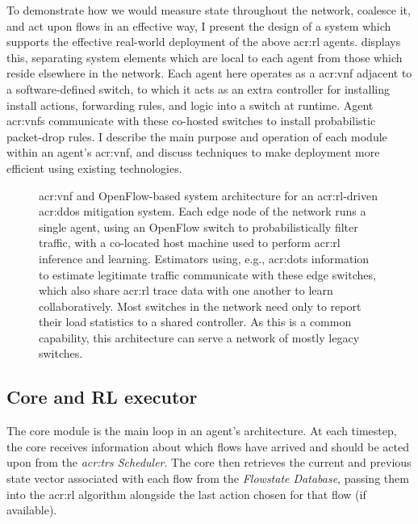 To demonstrate how we would measure state throughout the network, coalesce it, and act upon flows in an effective way, I present the design of a system which supports the effective real-world deployment of the above \gls{acr:rl} agents.
 displays this, separating system elements which are local to each agent from those which reside elsewhere in the network.
Each agent here operates as a \gls{acr:vnf} adjacent to a software-defined switch, to which it acts as an extra controller for installing install actions, forwarding rules, and logic into a switch at runtime.
Agent \glspl{acr:vnf} communicate with these co-hosted switches to install probabilistic packet-drop rules.
I describe the main purpose and operation of each module within an agent's \gls{acr:vnf}, and discuss techniques to make deployment more efficient using existing technologies.

\begin{figure}
	\centering
	\resizebox{\linewidth}{!}{}
	\caption[VNF and OpenFlow-based system architecture for an RL-driven DDoS mitigation system.]{
		\gls{acr:vnf} and OpenFlow-based system architecture for an \gls{acr:rl}-driven \gls{acr:ddos} mitigation system.
		Each edge node of the network runs a single agent, using an OpenFlow switch to probabilistically filter traffic, with a co-located host machine used to perform \gls{acr:rl} inference and learning.
		Estimators using, e.g., \gls{acr:dots} information to estimate legitimate traffic communicate with these edge switches, which also share \gls{acr:rl} trace data with one another to learn collaboratively.
		Most switches in the network need only to report their load statistics to a shared controller.
		As this is a common capability, this architecture can serve a network of mostly legacy switches.
		\label{fig:sys-arch}
	}
\end{figure}

\subsection{Core and RL executor}\label{sec:core-and-rl-executor}
The core module is the main loop in an agent's architecture.
At each timestep, the core receives information about which flows have arrived and should be acted upon from the \emph{\gls{acr:trs} Scheduler}.
The core then retrieves the current and previous state vector associated with each flow from the \emph{Flowstate Database}, passing them into the \gls{acr:rl} algorithm alongside the last action chosen for that flow (if available).

